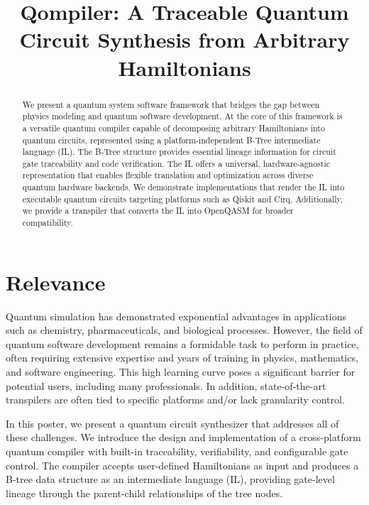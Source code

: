 \documentclass[conference]{IEEEtran}
\begin{document}
    \title{Qompiler: A Traceable Quantum Circuit Synthesis from Arbitrary Hamiltonians}

    \author{
    }

    \maketitle

    \begin{abstract}
        We present a quantum system software framework that bridges the gap between physics modeling and quantum software development.
        At the core of this framework is a versatile quantum compiler capable of decomposing arbitrary Hamiltonians into quantum circuits, represented using a platform-independent B-Tree intermediate language (IL).
        The B-Tree structure provides essential lineage information for circuit gate traceability and code verification.
        The IL offers a universal, hardware-agnostic representation that enables flexible translation and optimization across diverse quantum hardware backends.
        We demonstrate implementations that render the IL into executable quantum circuits targeting platforms such as Qiskit and Cirq.
        Additionally, we provide a transpiler that converts the IL into OpenQASM for broader compatibility.
    \end{abstract}


    \section{Relevance}\label{sec:relevance}
    Quantum simulation has demonstrated exponential advantages in applications such as chemistry, pharmaceuticals, and biological processes.
    However, the field of quantum software development remains a formidable task to perform in practice,
    often requiring extensive expertise and years of training in physics, mathematics, and software engineering.
    This high learning curve poses a significant barrier for potential users, including many professionals.
    In addition, state-of-the-art transpilers are often tied to specific platforms and/or lack granularity control.

    In this poster, we present a quantum circuit synthesizer that addresses all of these challenges.
    We introduce the design and implementation of a cross-platform quantum compiler with built-in traceability, verifiability, and configurable gate control.
    The compiler accepts user-defined Hamiltonians as input and produces a B-tree data structure as an intermediate language (IL),
    providing gate-level lineage through the parent-child relationships of the tree nodes.
\end{document}
